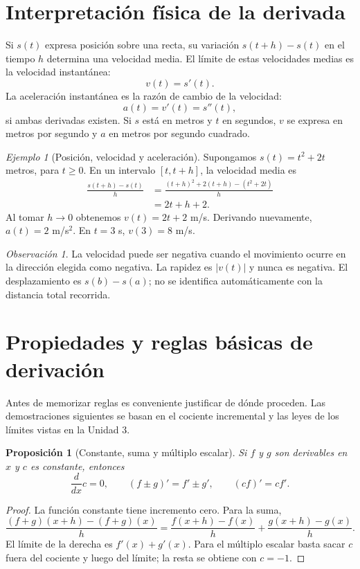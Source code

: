 \documentclass[12pt]{article}
\newtheorem{proposicion}[definicion]{Proposición}
\theoremstyle{remark}
\newtheorem{observacion}[definicion]{Observación}
\newtheorem{ejemplo}[definicion]{Ejemplo}
\begin{document}
\section{Interpretación física de la derivada}
Si $s(t)$ expresa posición sobre una recta, su variación $s(t+h)-s(t)$ en el tiempo $h$ determina una velocidad media. El límite de estas velocidades medias es la velocidad instantánea:
\[
\boxed{v(t)=s'(t).}
\]
La aceleración instantánea es la razón de cambio de la velocidad:
\[
\boxed{a(t)=v'(t)=s''(t),}
\]
si ambas derivadas existen. Si $s$ está en metros y $t$ en segundos, $v$ se expresa en metros por segundo y $a$ en metros por segundo cuadrado.

\begin{ejemplo}[Posición, velocidad y aceleración]
Supongamos $s(t)=t^2+2t$ metros, para $t\ge0$. En un intervalo $[t,t+h]$, la velocidad media es
\begin{align*}
\frac{s(t+h)-s(t)}h
&=\frac{(t+h)^2+2(t+h)-(t^2+2t)}h\\
&=2t+h+2.
\end{align*}
Al tomar $h\to0$ obtenemos $v(t)=2t+2$ m/s. Derivando nuevamente, $a(t)=2$ m/s$^2$. En $t=3$ s, $v(3)=8$ m/s.
\end{ejemplo}

\begin{observacion}
La velocidad puede ser negativa cuando el movimiento ocurre en la dirección elegida como negativa. La rapidez es $|v(t)|$ y nunca es negativa. El desplazamiento es $s(b)-s(a)$; no se identifica automáticamente con la distancia total recorrida.
\end{observacion}

\section{Propiedades y reglas básicas de derivación}
Antes de memorizar reglas es conveniente justificar de dónde proceden. Las demostraciones siguientes se basan en el cociente incremental y las leyes de los límites vistas en la Unidad 3.

\begin{proposicion}[Constante, suma y múltiplo escalar]
Si $f$ y $g$ son derivables en $x$ y $c$ es constante, entonces
\[
\boxed{\frac{d}{dx}c=0,\qquad(f\pm g)'=f'\pm g',\qquad(cf)'=cf'.}
\]
\end{proposicion}
\begin{proof}
La función constante tiene incremento cero. Para la suma,
\[
\frac{(f+g)(x+h)-(f+g)(x)}h
=\frac{f(x+h)-f(x)}h+\frac{g(x+h)-g(x)}h.
\]
El límite de la derecha es $f'(x)+g'(x)$. Para el múltiplo escalar basta sacar $c$ fuera del cociente y luego del límite; la resta se obtiene con $c=-1$.
\end{proof}
\end{document}
